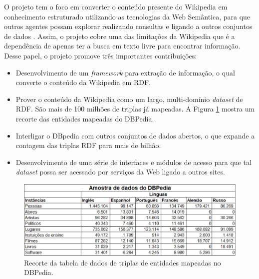 O projeto tem o foco em converter o conteúdo presente do Wikipedia em conhecimento estruturado utilizando as tecnologias da Web Semântica, para que outros agentes possam explorar realizando consultas e ligando a outros conjuntos de dados \citep{Auer:2007:DNW:1785162.1785216}. Assim, o projeto cobre uma das limitações da Wikipedia que é a dependência de apenas ter a busca em texto livre para encontrar informação. Desse papel, o projeto promove três importantes contribuições:

\begin{itemize}
	\item{Desenvolvimento de um \textit{framework} para extração de informação, o qual converte o conteúdo da Wikipedia em RDF.} 

	\item{Prover o conteúdo da Wikipedia como um largo, multi-domínio \textit{dataset} de RDF. São mais de 100 milhões de triplas já mapeadas. A Figura \ref{fig:dbpedia-triples} mostra um recorte das entidades mapeadas do DBPedia.}
	
	\item{Interligar o DBpedia com outros conjuntos de dados abertos, o que expande a contagem das triplas RDF para mais de bilhão.}
	
	\item{Desenvolvimento de uma série de interfaces e módulos de acesso para que tal \textit{dataset} possa ser acessado por serviços da Web ligado a outros sites.}	
\end{itemize}

\begin{figure}
	\centering
	\includegraphics[scale=0.60]{imagens/dbpedia_triples.jpg}
	\caption{Recorte da tabela de dados de triplas de entidades mapeadas no DBPedia. \citep{DBPedia:2014}}
	\label{fig:dbpedia-triples}
\end{figure}

